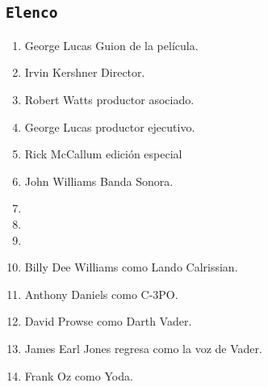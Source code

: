 \documentclass[11pt, a5paper]{article}
\begin{document}
{\subsection{{\tt{Elenco}}}
{\footnotesize{\begin{enumerate}
\item George Lucas Guion de la película.
\item Irvin Kershner Director.
\item Robert Watts productor asociado.
\item George Lucas productor ejecutivo.
\item Rick McCallum edición especial
\item John Williams Banda Sonora.
\item{}
\item{}
\item{}
\item Billy Dee Williams como Lando Calrissian.
\item Anthony Daniels como C-3PO.
\item David Prowse como Darth Vader.
\item James Earl Jones regresa como la voz de Vader.
\item Frank Oz como Yoda.
\end{enumerate}}}}

\end{document}

